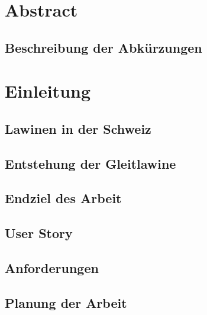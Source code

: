 \documentclass[a4paper,12pt]{article}
\begin{document}
\begin{titlepage}
  \end{titlepage}



\pagestyle{empty}
\section*{Abstract}

\subsection*{Beschreibung der Abkürzungen}

\tableofcontents
\newpage
\pagestyle{fancy}

\setcounter{page}{1}
\section{Einleitung}


\subsection{Lawinen in der Schweiz}


\subsection{Entstehung der Gleitlawine}


\subsection{Endziel des Arbeit}


\subsection{User Story}


\subsection{Anforderungen}


\subsection{Planung der Arbeit}

\end{document}
